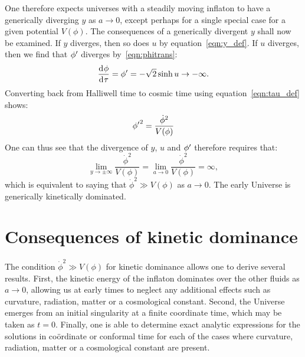 One therefore expects universes with a steadily moving inflaton to have a generically diverging $y$ as $a\to0$, except perhaps for a single special case for a given potential $V(\phi)$.  The consequences of a generically divergent $y$ shall now be examined.  If $y$ diverges, then so does $u$ by equation~\eqref{eqn:y_def}. If $u$ diverges, then we find that ${{\phi}^\prime}$ diverges by~\eqref{eqn:phitrans}:
%
\begin{equation}
  \frac{\operatorname{d}^{}\!{\phi}}{\operatorname{d}^{}\!{\tau}}={{\phi}^\prime} 
  = 
  -\sqrt{2}\sinh u\rightarrow -\infty.
\end{equation}
%
Converting back from Halliwell time to cosmic time using equation~\eqref{eqn:tau_def} shows:
%
\begin{equation}
  {{\phi}^\prime}^2 
  = 
  \frac{\dot{\phi}^2}{V(\phi)}
\end{equation}
%
One can thus see that the divergence of $y$, $u$ and ${{\phi}^\prime}$ therefore requires that:
%
\begin{equation}
  \lim\limits_{y\to\pm\infty} \frac{\dot\phi^2}{V(\phi)}
  =
  \lim\limits_{a\to 0} \frac{\dot\phi^2}{V(\phi)} = \infty,
  \label{eqn:kdfinal}
\end{equation}
%
which is equivalent to saying that $\dot{\phi}^2\gg V(\phi)$ as
$a\to0$. The early Universe is generically kinetically dominated.

\section{Consequences of kinetic dominance}
\label{sec:consequences_of_kinetic_dominance}

The condition $\dot\phi^2\gg V(\phi)$ for kinetic dominance allows one to derive several results. First, the kinetic energy of the inflaton dominates over the other fluids as $a\to 0$, allowing us at early times to neglect any additional effects such as curvature, radiation, matter or a cosmological constant. Second, the Universe emerges from an initial singularity at a finite coordinate time, which may be taken as $t=0$. Finally, one is able to determine exact analytic expressions for the solutions in co\"{o}rdinate or conformal time for each of the cases where curvature, radiation, matter or a cosmological constant are present.


